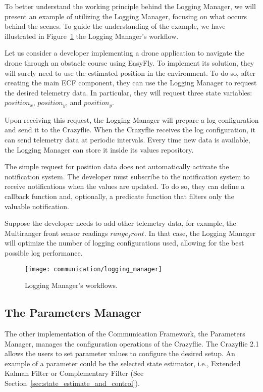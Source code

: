 To better understand the working principle behind the Logging Manager, we will present an example of utilizing the Logging Manager, focusing on what occurs behind the scenes.
To guide the understanding of the example, we have illustrated in Figure~\ref{fig:logging_manager} the Logging Manager's workflow.

Let us consider a developer implementing a drone application to navigate the drone through an obstacle course using EasyFly.
To implement its solution, they will surely need to use the estimated position in the environment. 
To do so, after creating the main ECF component, they can use the Logging Manager to request the desired telemetry data.
In particular, they will request three state variables: \( position_x \), \( position_y \), and \( position_y \).

Upon receiving this request, the Logging Manager will prepare a log configuration and send it to the Crazyflie.
When the Crazyflie receives the log configuration, it can send telemetry data at periodic intervals.
Every time new data is available, the Logging Manager can store it inside its values repository.

The simple request for position data does not automatically activate the notification system.
The developer must subscribe to the notification system to receive notifications when the values are updated.
To do so, they can define a callback function and, optionally, a predicate function that filters only the valuable notification.

Suppose the developer needs to add other telemetry data, for example, the Multiranger front sensor readings \( range_front \). 
In that case, the Logging Manager will optimize the number of logging configurations used, allowing for the best possible log performance.

\begin{figure}[tb]
    \centering
    \texttt{[image: communication/logging\_manager]}
    \caption{Logging Manager's workflows.}\label{fig:logging_manager}
\end{figure}

\subsection{The Parameters Manager}\label{subsec:parameter_manager}

The other implementation of the Communication Framework, the Parameters Manager, manages the configuration operations of the Crazyflie.
The Crazyflie 2.1 allows the users to set parameter values to configure the desired setup. 
An example of a parameter could be the selected state estimator, i.e., Extended Kalman Filter or Complementary Filter (See Section~\ref{sec:state_estimate_and_control}).

